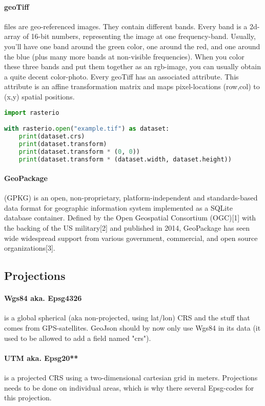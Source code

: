 \paragraph{geoTiff} files are geo-referenced images. They contain different bands.
Every band is a 2d-array of 16-bit numbers, representing the image at one frequency-band.
Usually, you'll have one band around the green color, one around the red, and one around the blue (plus many more bands at non-visible frequencies).
When you color these three bands and put them together as an rgb-image, you can usually obtain a quite decent color-photo.
Every geoTiff has an associated  attribute. This attribute is an affine transformation matrix and maps pixel-locations (row,col) to (x,y) spatial positions.
\begin{lstlisting}[language=python]
import rasterio

with rasterio.open("example.tif") as dataset:
    print(dataset.crs)
    print(dataset.transform)
    print(dataset.transform * (0, 0))
    print(dataset.transform * (dataset.width, dataset.height))
\end{lstlisting}

\paragraph{GeoPackage} (GPKG) is an open, non-proprietary, platform-independent and standards-based data format for geographic information system implemented as a SQLite database container.
Defined by the Open Geospatial Consortium (OGC)[1] with the backing of the US military[2] and published in 2014, GeoPackage has seen wide widespread support from various government,
commercial, and open source organizations[3].








\subsection{Projections}

\paragraph{Wgs84 aka. Epsg4326} is a global spherical (aka non-projected, using lat/lon) CRS and the stuff that comes from GPS-satellites. GeoJson should by now only  use Wgs84 in its data (it used to be allowed to add a field named "crs").
\paragraph{UTM aka. Epsg20**} is a projected CRS using a  two-dimensional cartesian grid in meters. Projections needs to be done on individual areas, which is why there several Epsg-codes for this projection.
